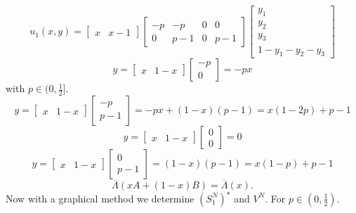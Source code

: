 \documentclass[a4paper, twoside, openany]{book}
\begin{document}
$$u_1(x, y) = \begin{bmatrix} x & x-1 \end{bmatrix}
			  \begin{bmatrix}
			  -p & -p & 0 & 0 \\
			  0 & p-1 & 0 & p-1
			  \end{bmatrix}
			  \begin{bmatrix}
			  y_1 \\
			  y_2 \\
			  y_3 \\
			  1 - y_1 - y_2 - y_3
			  \end{bmatrix}$$
$$y = \begin{bmatrix} x & 1-x\end{bmatrix}\begin{bmatrix}
											-p \\
											0
										 \end{bmatrix} = -p x$$
with $p \in (0, \frac{1}{2}]$.
$$y = \begin{bmatrix} x & 1 - x\end{bmatrix}\begin{bmatrix}
											-p \\
											p -1
										   \end{bmatrix} = -px + (1 -x)(p - 1) = x( 1 - 2p) + p - 1$$
$$y = \begin{bmatrix} x & 1 - x \end{bmatrix} \begin{bmatrix}
												0 \\
												0
										     \end{bmatrix} = 0$$
$$y = \begin{bmatrix} x & 1-x \end{bmatrix} \begin{bmatrix}
												0 \\
												p - 1
										   \end{bmatrix} = (1 - x)(p - 1) = x(1 - p) + p - 1$$
$$\overline{\Lambda}(xA + (1 -x)B) = \overline{\Lambda}(x).$$
Now with a graphical method we determine $(S^N_1)^{\star}$ and $V^N$. For $p \in (0, \frac{1}{2})$.
\end{document}
